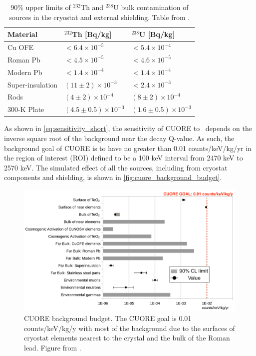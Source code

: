\begin{table}[htbp]
\centering
\caption[90\% upper limits of $^{232}$Th and $^{238}$U bulk contamination of sources in the cryostat and external shielding.]
{90\% upper limits of $^{232}$Th and $^{238}$U bulk contamination of sources in the cryostat and external shielding.
Table from \cite{Alduino:2017qet}.}
\label{tab:FarDetectorSources_Bulk}
\begin{tabular}{lll}
\hline
\hline
Material         & $^{232}$Th [Bq/kg]         & $^{238}$U [Bq/kg]    \\
\hline
Cu OFE             & $<6.4\times10^{-5}$ & $<5.4\times10^{-4}$      \\
Roman Pb            & $<4.5\times10^{-5}$ & $<4.6\times10^{-5}$      \\
Modern Pb            & $<1.4\times10^{-4}$ & $<1.4\times10^{-4}$      \\
Super-insulation  & $(11\pm2)\times10^{-3}$ & $<2.4\times10^{-3}$      \\
Rods  & $(4\pm2)\times10^{-4}$ & $(8\pm2)\times10^{-4}$      \\
300-K Plate & $(4.5\pm0.5)\times10^{-3}$ & $(1.6\pm0.5)\times10^{-3}$      \\
\hline
\hline
\end{tabular}
\end{table}

As shown in \autoref{eq:sensitivity_short}, the sensitivity of CUORE to \zeronubb~depends on the inverse square root of the background near the decay Q-value.
As such, the background goal of CUORE is to have no greater than 0.01 counts/keV/kg/yr in the region of interest (ROI) defined to be a 100 keV interval from 2470 keV to 2570 keV.
The simulated effect of all the sources, including from cryostat components and shielding, is shown in \autoref{fig:cuore_background_budget}.

\begin{figure}[htbp]
\centering
\includegraphics[width=0.8\linewidth]{Figures/CUORE_background_budget}
\caption[CUORE background budget.]
{CUORE background budget.
The CUORE goal is 0.01 counts/keV/kg/y with most of the background due to the surfaces of cryostat elements nearest to the crystal and the bulk of the Roman lead.
Figure from \cite{Alduino:2017qet}.}
\label{fig:cuore_background_budget}
\end{figure}